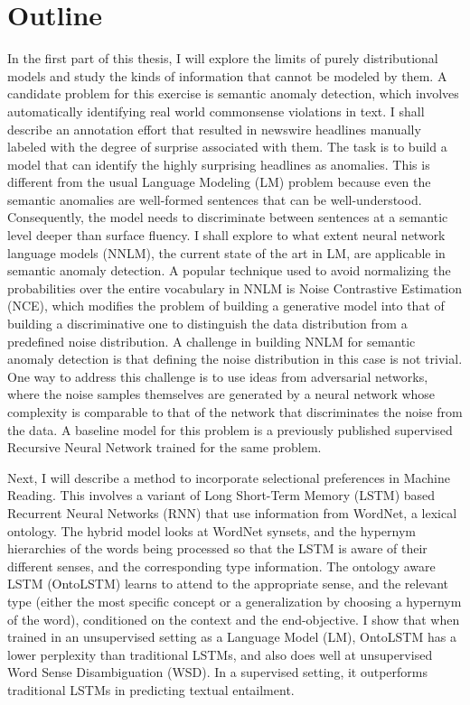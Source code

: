 \section{Outline}
In the first part of this thesis, I will explore the limits of purely distributional models
and study the kinds of information that cannot be modeled by them. A candidate problem for this
exercise is semantic anomaly detection, which involves automatically 
identifying real world commonsense violations in text. I shall describe an annotation
effort that resulted in newswire headlines manually labeled with the degree
of surprise associated with them. The task is to build a model that can identify the highly
surprising headlines as anomalies. This is different from the usual Language Modeling (LM) problem
because even the semantic anomalies are well-formed sentences that can be well-understood. Consequently,
the model needs to discriminate between sentences at a semantic level deeper than surface fluency.
I shall explore to what extent neural network language models (NNLM), the current state of the art in LM,
are applicable in semantic anomaly detection. A popular technique used to avoid normalizing the probabilities
over the entire vocabulary in NNLM is Noise Contrastive Estimation (NCE), which modifies the problem of 
building a generative model into that of building a discriminative one to distinguish the data distribution
from a predefined noise distribution. A challenge in building NNLM for semantic anomaly detection is that defining 
the noise distribution in this case is not trivial. One way to address this challenge is to use ideas from 
adversarial networks, where the noise samples themselves are generated by a neural network whose complexity
is comparable to that of the network that discriminates the noise from the data. A baseline model for this 
problem is a previously published supervised Recursive Neural Network trained for the same problem.


Next, I will describe a method to incorporate selectional 
preferences in Machine Reading. This involves a variant of Long Short-Term
Memory (LSTM) based Recurrent Neural Networks (RNN) that use information
from WordNet, a lexical 
ontology. The hybrid model looks at WordNet synsets, and the hypernym hierarchies of the
words being processed so that the 
LSTM is aware of their different senses, and the corresponding type information.
The ontology aware LSTM (OntoLSTM) learns to attend to the appropriate sense,
and the relevant type 
(either the most specific concept or a generalization by choosing a hypernym of
the word), conditioned on the context and the end-objective. I show that when
trained in an 
unsupervised setting as a Language Model (LM), OntoLSTM has a lower perplexity
than traditional LSTMs, and also does well at unsupervised Word Sense
Disambiguation (WSD). In a supervised setting, 
it outperforms traditional LSTMs in predicting textual entailment.

